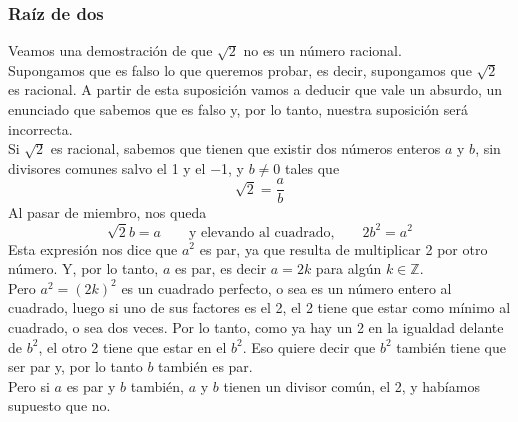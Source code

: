 \documentclass[Análisis.root.tex]{subfiles}
\newcommand{\Z}{\mathbb{Z}}
\begin{document}
        \subsubsection{Raíz de dos}
        Veamos una demostración de que \(\sqrt{2}\) no es un número racional.\\
        Supongamos que es falso lo que queremos probar, es decir, supongamos que \(\sqrt{2}\) es racional. A partir de esta suposición vamos a deducir que vale un absurdo, un enunciado que sabemos que es falso y, por lo tanto, nuestra suposición será incorrecta.\\
        Si \(\sqrt{2}\) es racional, sabemos que tienen que existir dos números enteros \(a\) y \(b\), sin divisores comunes salvo el 1 y el −1, y \(b \neq 0\) tales que \[\sqrt{2}=\frac{a}{b}\] Al pasar de miembro, nos queda
        \[\sqrt{2}b=a\qquad\text{y elevando al cuadrado,}\qquad 2b^2=a^2\]
        Esta expresión nos dice que \(a^2\) es par, ya que resulta de multiplicar 2 por otro número. Y, por lo tanto, \(a\) es par, es decir \(a = 2k\) para algún \(k \in \Z\).\\
        Pero \(a^2 = (2k)^2\) es un cuadrado perfecto, o sea es un número entero al cuadrado, luego si uno de sus factores es el 2, el 2 tiene que estar como mínimo al cuadrado, o sea dos veces. Por lo tanto, como ya hay un 2 en la igualdad delante de \(b^2\), el otro 2 tiene que estar en el \(b^2\). Eso quiere decir que \(b^2\) también tiene que ser par y, por lo tanto \(b\) también es par.\\
        Pero si \(a\) es par y \(b\) también, \(a\) y \(b\) tienen un divisor común, el 2, y habíamos supuesto que no.
\end{document}
